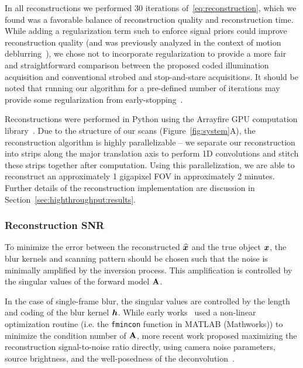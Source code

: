 In all reconstructions we performed 30 iterations of~\eqref{eq:reconstruction}, which we found was a favorable balance of reconstruction quality and reconstruction time. While adding a regularization term such to enforce signal priors could improve reconstruction quality (and was previously analyzed in the context of motion deblurring~\cite{mitra:2014}), we chose not to incorporate regularization to provide a more fair and straightforward comparison between the proposed coded illumination acquisition and conventional strobed and stop-and-stare acquisitions. It should be noted that running our algorithm for a pre-defined number of iterations may provide some regularization from early-stopping~\cite{hagiwara2000regularization}.

Reconstructions were performed in Python using the Arrayfire GPU computation library~\cite{Yalamanchili2015}.
Due to the structure of our scans (Figure~\ref{fig:system}A), the reconstruction algorithm is highly parallelizable -- we separate our reconstruction into strips along the major translation axis to perform 1D convolutions and stitch these strips together after computation.
Using this parallelization, we are able to reconstruct an approximately 1 gigapixel FOV in approximately 2 minutes. Further details of the reconstruction implementation are discussion in Section~\ref{sec:highthroughput:results}.

\subsubsection{Reconstruction SNR}\label{sec:highthroughput:methods_snr}

To minimize the error between the reconstructed $\widehat {\bm{x}}$ and the true object $\bm{x}$, the blur kernels and scanning pattern should be chosen such that the noise is minimally amplified by the inversion process. This amplification is controlled by the singular values of the forward model $\mathbf{A}$.

In the case of single-frame blur, the singular values are controlled by the length and coding of the blur kernel $\bm{h}$.
While early works~\cite{raskar2006coded, Ma:15} used a non-linear optimization routine (i.e. the \texttt{fmincon} function in MATLAB (Mathworks)) to minimize the condition number of $\mathbf{A}$, more recent work proposed maximizing the reconstruction signal-to-noise ratio directly, using camera noise parameters, source brightness, and the well-posedness of the deconvolution~\cite{agrawal2009optimal, cossairt2013does}.

